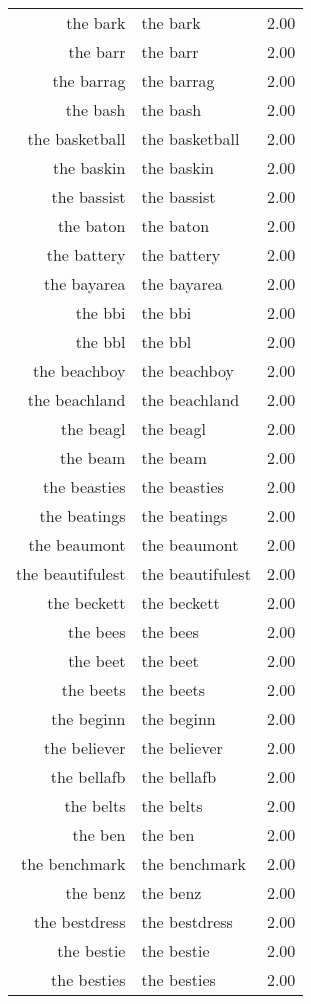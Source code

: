 \begin{table}[ht]
\begin{tabular}{rlr}
  the bark & the bark & 2.00 \\ 
  the barr & the barr & 2.00 \\ 
  the barrag & the barrag & 2.00 \\ 
  the bash & the bash & 2.00 \\ 
  the basketball & the basketball & 2.00 \\ 
  the baskin & the baskin & 2.00 \\ 
  the bassist & the bassist & 2.00 \\ 
  the baton & the baton & 2.00 \\ 
  the battery & the battery & 2.00 \\ 
  the bayarea & the bayarea & 2.00 \\ 
  the bbi & the bbi & 2.00 \\ 
  the bbl & the bbl & 2.00 \\ 
  the beachboy & the beachboy & 2.00 \\ 
  the beachland & the beachland & 2.00 \\ 
  the beagl & the beagl & 2.00 \\ 
  the beam & the beam & 2.00 \\ 
  the beasties & the beasties & 2.00 \\ 
  the beatings & the beatings & 2.00 \\ 
  the beaumont & the beaumont & 2.00 \\ 
  the beautifulest & the beautifulest & 2.00 \\ 
  the beckett & the beckett & 2.00 \\ 
  the bees & the bees & 2.00 \\ 
  the beet & the beet & 2.00 \\ 
  the beets & the beets & 2.00 \\ 
  the beginn & the beginn & 2.00 \\ 
  the believer & the believer & 2.00 \\ 
  the bellafb & the bellafb & 2.00 \\ 
  the belts & the belts & 2.00 \\ 
  the ben & the ben & 2.00 \\ 
  the benchmark & the benchmark & 2.00 \\ 
  the benz & the benz & 2.00 \\ 
  the bestdress & the bestdress & 2.00 \\ 
  the bestie & the bestie & 2.00 \\ 
  the besties & the besties & 2.00 \\ 

\end{tabular}
\end{table}
